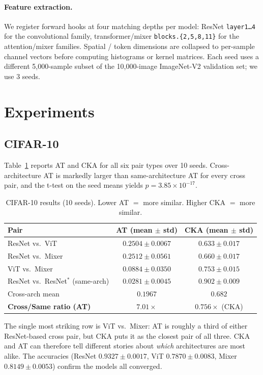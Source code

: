 \documentclass[11pt]{article}
\begin{document}
\paragraph{Feature extraction.} We register forward hooks at four
matching depths per model: ResNet \texttt{layer1\dots4} for the
convolutional family, transformer/mixer \texttt{blocks.\{2,5,8,11\}}
for the attention/mixer families. Spatial / token dimensions are
collapsed to per-sample channel vectors before computing histograms or
kernel matrices. Each seed uses a different 5{,}000-sample subset of the
10{,}000-image ImageNet-V2 validation set; we use 3 seeds.

\section{Experiments}

\subsection{CIFAR-10}

Table~\ref{tab:cifar10} reports AT and CKA for all six pair types over
10 seeds. Cross-architecture AT is markedly larger than
same-architecture AT for every cross pair, and the t-test on the seed
means yields $p = 3.85 \times 10^{-17}$.

\begin{table}[t]
\centering
\caption{CIFAR-10 results (10 seeds). Lower AT $=$ more similar.
Higher CKA $=$ more similar.}
\label{tab:cifar10}
\begin{tabular}{lcc}
\toprule
Pair & AT (mean $\pm$ std) & CKA (mean $\pm$ std) \\
\midrule
ResNet vs.\ ViT     & $0.2504 \pm 0.0067$ & $0.633 \pm 0.017$ \\
ResNet vs.\ Mixer   & $0.2512 \pm 0.0561$ & $0.660 \pm 0.017$ \\
ViT vs.\ Mixer      & $0.0884 \pm 0.0350$ & $0.753 \pm 0.015$ \\
\midrule
ResNet vs.\ ResNet$^*$ (same-arch) & $0.0281 \pm 0.0045$ & $0.902 \pm 0.009$ \\
\midrule
Cross-arch mean     & $0.1967$            & $0.682$ \\
\textbf{Cross/Same ratio (AT)} & $\mathbf{7.01\times}$ & $0.756\times$ (CKA) \\
\bottomrule
\end{tabular}
\end{table}

The single most striking row is ViT vs.\ Mixer: AT is roughly a third
of either ResNet-based cross pair, but CKA puts it as the closest pair
of all three. CKA and AT can therefore tell different stories
about \emph{which} architectures are most alike. The accuracies
(ResNet $0.9327 \pm 0.0017$, ViT $0.7870 \pm 0.0083$,
Mixer $0.8149 \pm 0.0053$) confirm the models all converged.
\end{document}
